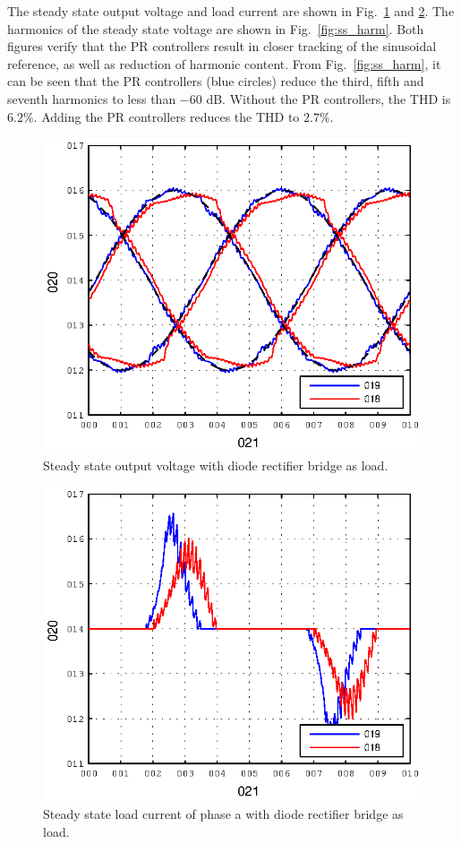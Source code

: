 \documentclass[conference,10pt]{IEEEtran}
\begin{document}
The steady state output voltage and load current are shown in Fig.~\ref{fig:ss_vc} and \ref{fig:ss_iload}. The harmonics of the steady state voltage are shown in Fig.~\ref{fig:ss_harm}. Both figures verify that the PR controllers result in closer tracking of the sinusoidal reference, 
as well as reduction of harmonic content. From Fig.~\ref{fig:ss_harm}, it can be seen that the PR controllers (blue circles) reduce the third, fifth and seventh harmonics to less than $-60$ dB.
Without the PR controllers, the THD is $6.2 \%$. Adding the PR controllers reduces the THD to $2.7 \%$.
\begin{figure}[!h]
\centering

\includegraphics{fig/steady_state_vCf}
\caption{Steady state output voltage with diode rectifier bridge as load.}
\label{fig:ss_vc}
\end{figure}
\begin{figure}[!h]
\centering

\includegraphics{fig/steady_state_iLoad}
\caption{Steady state load current of phase a with diode rectifier bridge as load.}
\label{fig:ss_iload}
\end{figure}
\end{document}
